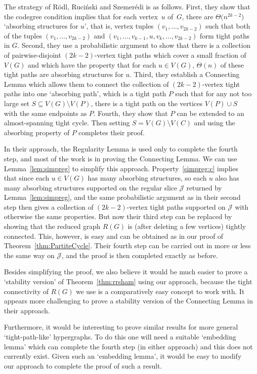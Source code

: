 \documentclass[12pt,a4paper]{amsart}
\let\subset\subseteq
\newcommand{\cJ}{\mathcal{J}}
\begin{document}
The strategy of R\"odl, Ruci\'nski and Szemer\'edi is as follows. First,
they show that the codegree condition implies that for each vertex~$u$
of~$G$, there are $\Theta\big(n^{2k-2}\big)$ `absorbing structures for
$u$', that is, vertex tuples $(v_1,\ldots,v_{2k-2})$ such that both of the
tuples $(v_1,\ldots,v_{2k-2})$ and
$(v_1,\ldots,v_{k-1},u,v_k,\ldots,v_{2k-2})$ form tight paths in
$G$. Second, they use a probabilistic argument to show that there is a
collection of pairwise-disjoint $(2k-2)$-vertex tight paths which cover a
small fraction of $V(G)$ and which have the property that for each $u\in
V(G)$, $\Theta(n)$ of these tight paths are absorbing structures for
$u$. Third, they establish a Connecting Lemma which allows them to connect
the collection of $(2k-2)$-vertex tight paths into one `absorbing path',
which is a tight path $P$ such that for any not too large set $S\subset
V(G)\setminus V(P)$, there is a tight path on the vertices $V(P)\cup S$
with the same endpoints as $P$. Fourth, they show that $P$ can be extended
to an almost-spanning tight cycle. Then setting $S=V(G)\setminus V(C)$ and
using the absorbing property of $P$ completes their proof.

In their approach, the Regularity Lemma is used only to complete the fourth
step, and most of the work is in proving the Connecting Lemma. We can use
Lemma~\ref{lem:simpreg} to simplify this approach. Property~\ref{simpreg:c}
implies that since each $u\in V(G)$ has many absorbing structures, so each
$u$ also has many absorbing structures supported on the regular slice $\cJ$
returned by Lemma~\ref{lem:simpreg}, and the same probabilistic argument as
in their second step then gives a collection of $(2k-2)$-vertex tight paths
supported on $\cJ$ with otherwise the same properties. But now their third
step can be replaced by showing that the reduced graph $R(G)$ is (after
deleting a few vertices) tightly connected. This, however, is easy and can
be obtained as in our proof of Theorem~\ref{thm:PartiteCycle}. Their fourth
step can be carried out in more or less the same way on $\cJ$, and the
proof is then completed exactly as before.

Besides simplifying the proof, we also believe it would be much easier to
prove a `stability version' of Theorem~\ref{thm:rrsham} using our approach,
because the tight connectivity of $R(G)$ we use is a comparatively easy
concept to work with. It appears more challenging to prove a stability version
of the Connecting Lemma in their approach. 

Furthermore, it would be interesting to prove similar results for more
general `tight-path-like' hypergraphs. To do this one will need a suitable
`embedding lemma' which can complete the fourth step (in either approach)
and this does not currently exist. Given such an `embedding lemma', it
would be easy to modify our approach to complete the proof of such a
result.
\end{document}
